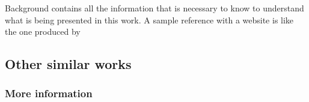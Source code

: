 \documentclass[../00_Main.tex]{subfiles}
\begin{document}
Background contains all the information that is necessary to know to understand what is being presented in this work.  A sample reference with a website is like the one produced by \cite{Microsoft.2024}

\subsection{Other similar works}


\subsubsection{More information}


\biblio %
\end{document}
